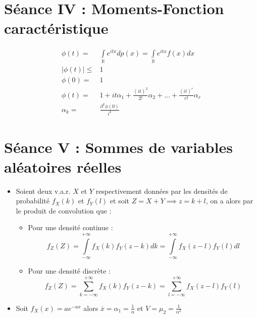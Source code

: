 \documentclass[a4paper,11pt]{report}
\begin{document}
\section{Séance IV : Moments-Fonction caractéristique}
\begin{align*}
	\phi(t) =& \int\limits_{\mathbb{R}}{e^{itx}dp(x)} =
		\int\limits_{\mathbb{R}}e^{itx}f(x)dx \\
	|\phi(t)| \le& 1 \\
	\phi(0) =& 1 \\
	\phi(t) =& 1 + it\alpha_1 + \frac{(it)^2}{2!}\alpha_2 + \dots + \frac{(it)^r}{r!}\alpha_r \\
	\alpha_k =& \frac{\partial^k \phi(0)}{i^k}
\end{align*}

\section{Séance V : Sommes de variables aléatoires réelles}
\begin{itemize}
	\item Soient deux v.a.r. $X$ et $Y$ respectivement données par les densités de probabilité $f_X(k)$ et $f_Y(l)$ et soit $Z = X+Y \implies z = k+l$, on a alors par le produit de convolution que :
	\begin{itemize}
		\item Pour une densité continue :
			\[
				f_Z(Z) = \int\limits_{-\infty}^{+\infty}{f_X(k)f_Y(z-k)dk} = \int\limits_{-\infty}^{+\infty}{f_X(z-l)f_Y(l)dl}
			\]
		\item Pour une densité discrète :
			\[
				f_Z(Z) = \sum\limits_{k=-\infty}^{+\infty}{f_X(k)f_Y(z-k)} = \sum\limits_{l=-\infty}^{+\infty}{f_X(z-l)f_Y(l)}
			\]
	\end{itemize}
	\item Soit $f_X(x) = ae^{-ax}$ alors $\overline{x} = \alpha_1 = \frac{1}{\alpha}$ et $V = \mu_2 = \frac{1}{\alpha^2}$
\end{itemize}

\end{document}
